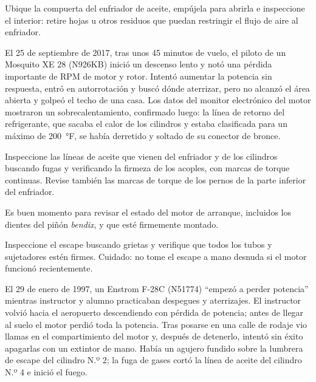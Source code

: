 Ubique la compuerta del enfriador de aceite, empújela para abrirla e inspeccione el interior: retire hojas u otros residuos que puedan restringir el flujo de aire al enfriador.

\begin{caso}
El 25 de septiembre de 2017, tras unos 45 minutos de vuelo, el piloto de un Mosquito XE 28 (N926KB) inició un descenso lento y notó una pérdida importante de RPM de motor y rotor. Intentó aumentar la potencia sin respuesta, entró en autorrotación y buscó dónde aterrizar, pero no alcanzó el área abierta y golpeó el techo de una casa. Los datos del monitor electrónico del motor mostraron un sobrecalentamiento, confirmado luego: la línea de retorno del refrigerante, que sacaba el calor de los cilindros y estaba clasificada para un máximo de 200~°F, se había derretido y soltado de su conector de bronce.
\end{caso}

Inspeccione las líneas de aceite que vienen del enfriador y de los cilindros buscando fugas y verificando la firmeza de los acoples, con marcas de torque continuas. Revise también las marcas de torque de los pernos de la parte inferior del enfriador.

\begin{nota}
Es buen momento para revisar el estado del motor de arranque, incluidos los dientes del piñón \emph{bendix}, y que esté firmemente montado.
\end{nota}

Inspeccione el escape buscando grietas y verifique que todos los tubos y sujetadores estén firmes. Cuidado: no tome el escape a mano desnuda si el motor funcionó recientemente.

\begin{caso}
El 29 de enero de 1997, un Enstrom F-28C (N51774) ``empezó a perder potencia'' mientras instructor y alumno practicaban despegues y aterrizajes. El instructor volvió hacia el aeropuerto descendiendo con pérdida de potencia; antes de llegar al suelo el motor perdió toda la potencia. Tras posarse en una calle de rodaje vio llamas en el compartimiento del motor y, después de detenerlo, intentó sin éxito apagarlas con un extintor de mano. Había un agujero fundido sobre la lumbrera de escape del cilindro N.º 2; la fuga de gases cortó la línea de aceite del cilindro N.º 4 e inició el fuego.
\end{caso}

